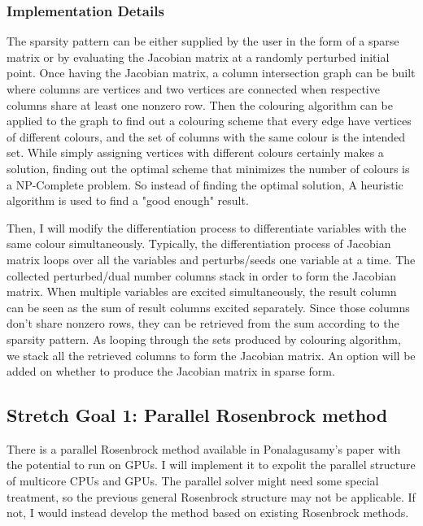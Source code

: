 \documentclass[a4paper]{article}
\begin{document}
\subsubsection{Implementation Details}
\label{sec:org48112c4}
The sparsity pattern can be either supplied by the user in the form of a sparse
matrix or by evaluating the Jacobian matrix at a randomly perturbed initial
point. Once having the Jacobian matrix, a column intersection graph can be built
where columns are vertices and two vertices are connected when respective
columns share at least one nonzero row. Then the colouring algorithm can be
applied to the graph to find out a colouring scheme that every edge have
vertices of different colours, and the set of columns with the same colour is
the intended set. While simply assigning vertices with different colours
certainly makes a solution, finding out the optimal scheme that minimizes the
number of colours is a NP-Complete problem. So instead of finding the optimal
solution, A heuristic algorithm is used to find a "good enough" result.

Then, I will modify the differentiation process to differentiate variables with
the same colour simultaneously. Typically, the differentiation process of
Jacobian matrix loops over all the variables and perturbs/seeds one variable at
a time. The collected perturbed/dual number columns stack in order to form the
Jacobian matrix. When multiple variables are excited simultaneously, the result
column can be seen as the sum of result columns excited separately. Since those
columns don't share nonzero rows, they can be retrieved from the sum according
to the sparsity pattern. As looping through the sets produced by colouring
algorithm, we stack all the retrieved columns to form the Jacobian matrix. An
option will be added on whether to produce the Jacobian matrix in sparse form.

\subsection{Stretch Goal 1: Parallel Rosenbrock method}
\label{sec:org48f3091}
There is a parallel Rosenbrock method available in Ponalagusamy's paper \cite{five} with
the potential to run on GPUs. I will implement it to expolit the parallel
structure of multicore CPUs and GPUs. The parallel solver might need some
special treatment, so the previous general Rosenbrock structure may not be
applicable. If not, I would instead develop the method based on existing
Rosenbrock methods.
\end{document}
